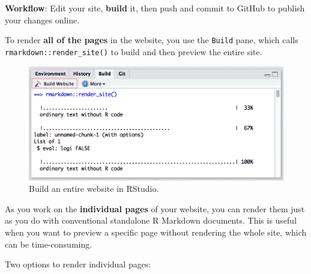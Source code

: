 \documentclass[
  a4paper,
  twoside,
  openright]{book}
\theoremstyle{definition}
\theoremstyle{definition}
\theoremstyle{definition}
\theoremstyle{definition}
\theoremstyle{remark}
\begin{document}
{\textbf{Workflow}}: Edit your site, \textbf{build} it, then push and commit to GitHub to publish your changes online.

To render {\textbf{all of the pages}} in the website, you use the \texttt{Build} pane, which calls \texttt{rmarkdown::render\_site()} to build and then preview the entire site.

\begin{figure}
\includegraphics[width=16.72in]{images/site-build} \caption{Build an entire website in RStudio.}\label{fig:unnamed-chunk-2}
\end{figure}

As you work on the {\textbf{individual pages}} of your website, you can render them just as you do with conventional standalone R Markdown documents. This is useful when you want to preview a specific page without rendering the whole site, which can be time-consuming.

Two options to render individual pages:
\end{document}

